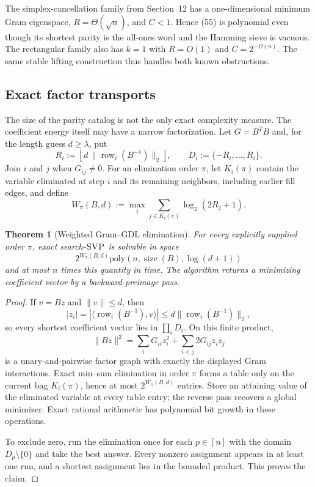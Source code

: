 \documentclass[10pt]{article}
\newtheorem{theorem}{Theorem}[section]
\theoremstyle{definition}
\newcommand{\poly}{\mathrm{poly}}
\newcommand{\SVP}{\textnormal{\textsc{SVP}}}
\newcommand{\ip}[2]{\langle #1,#2\rangle}
\newcommand{\norm}[1]{\lVert #1\rVert}
\begin{document}
The simplex-cancellation family from Section~12 has a one-dimensional
minimum Gram eigenspace, $R=\Theta(\sqrt n)$, and $C<1$.  Hence (55) is
polynomial even though its shortest parity is the all-ones word and the
Hamming sieve is vacuous.  The rectangular family also has $k=1$ with
$R=O(1)$ and $C=2^{-\Omega(n)}$.  The same stable lifting construction thus
handles both known obstructions.

\subsection{Exact factor transports}

The size of the parity catalog is not the only exact complexity measure.
The coefficient energy itself may have a narrow factorization.  Let
$G=B^TB$ and, for the length guess $d\geq\lambda$, put
\[
 R_i:=\left\lfloor d\,\norm{\operatorname{row}_i(B^{-1})}_2\right\rfloor,
 \qquad D_i:=\{-R_i,\ldots,R_i\}.                              \tag{57}
\]
Join $i$ and $j$ when $G_{ij}\ne0$.  For an elimination order $\pi$, let
$K_i(\pi)$ contain the variable eliminated at step $i$ and its remaining
neighbors, including earlier fill edges, and define
\[
 W_\pi(B,d):=\max_i\sum_{j\in K_i(\pi)}\log_2(2R_j+1).          \tag{58}
\]

\begin{theorem}[Weighted Gram--GDL elimination]                 \label{thm:gdl}
For every explicitly supplied order $\pi$, exact search-$\SVP$ is solvable
in space
\[
 2^{W_\pi(B,d)}\poly(n,\operatorname{size}(B),\log(d+1))
\]
and at most $n$ times this quantity in time.  The algorithm returns a
minimizing coefficient vector by a backward-preimage pass.
\end{theorem}

\begin{proof}
If $v=Bz$ and $\norm v\le d$, then
\[
 |z_i|=|\ip{\operatorname{row}_i(B^{-1})}{v}|
 \le d\norm{\operatorname{row}_i(B^{-1})}_2,
\]
so every shortest coefficient vector lies in $\prod_iD_i$.  On this finite
product,
\[
 \norm{Bz}^2=\sum_iG_{ii}z_i^2+
              \sum_{i<j}2G_{ij}z_iz_j                         \tag{59}
\]
is a unary-and-pairwise factor graph with exactly the displayed Gram
interactions.  Exact min--sum elimination in order $\pi$ forms a table only
on the current bag $K_i(\pi)$, hence at most $2^{W_\pi(B,d)}$ entries.
Store an attaining value of the eliminated variable at every table entry;
the reverse pass recovers a global minimizer.  Exact rational arithmetic has
polynomial bit growth in these operations.

To exclude zero, run the elimination once for each $p\in[n]$ with the domain
$D_p\setminus\{0\}$ and take the best answer.  Every nonzero assignment
appears in at least one run, and a shortest assignment lies in the bounded
product.  This proves the claim.
\end{proof}
\end{document}
